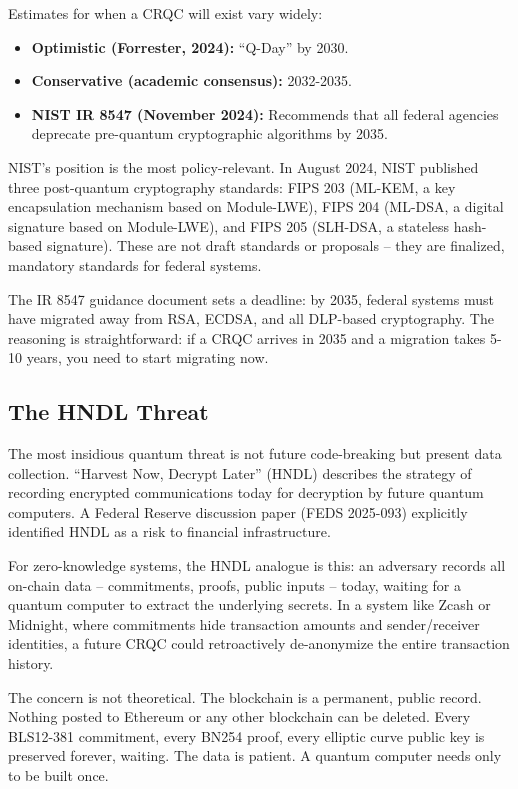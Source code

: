 \documentclass[
  11pt,
  openany]{report}
\providecommand{\tightlist}{%
  \setlength{\itemsep}{0pt}\setlength{\parskip}{0pt}}
\renewcommand{\textbf}[1]{{\bfseries\color{MidnightBold}#1}}
\begin{document}
Estimates for when a CRQC will exist vary widely:

\begin{itemize}
\tightlist
\item
  \textbf{Optimistic (Forrester, 2024):} ``Q-Day'' by 2030.
\item
  \textbf{Conservative (academic consensus):} 2032-2035.
\item
  \textbf{NIST IR 8547 (November 2024):} Recommends that all federal agencies
  deprecate pre-quantum cryptographic algorithms by 2035.
\end{itemize}

NIST's position is the most policy-relevant. In August 2024, NIST published
three post-quantum cryptography standards: FIPS 203 (ML-KEM, a key encapsulation
mechanism based on Module-LWE), FIPS 204 (ML-DSA, a digital signature based on
Module-LWE), and FIPS 205 (SLH-DSA, a stateless hash-based signature). These are
not draft standards or proposals -- they are finalized, mandatory standards for
federal systems.

The IR 8547 guidance document sets a deadline: by 2035, federal systems must
have migrated away from RSA, ECDSA, and all DLP-based cryptography. The
reasoning is straightforward: if a CRQC arrives in 2035 and a migration takes
5-10 years, you need to start migrating now.

\subsection{The HNDL Threat}\label{the-hndl-threat}

The most insidious quantum threat is not future code-breaking but present data
collection. ``Harvest Now, Decrypt Later'' (HNDL) describes the strategy of
recording encrypted communications today for decryption by future quantum
computers. A Federal Reserve discussion paper (FEDS 2025-093) explicitly
identified HNDL as a risk to financial infrastructure.

For zero-knowledge systems, the HNDL analogue is this: an adversary records all
on-chain data -- commitments, proofs, public inputs -- today, waiting for a
quantum computer to extract the underlying secrets. In a system like Zcash or
Midnight, where commitments hide transaction amounts and sender/receiver
identities, a future CRQC could retroactively de-anonymize the entire
transaction history.

The concern is not theoretical. The blockchain is a permanent, public record.
Nothing posted to Ethereum or any other blockchain can be deleted. Every
BLS12-381 commitment, every BN254 proof, every elliptic curve public key is
preserved forever, waiting. The data is patient. A quantum computer needs only
to be built once.
\end{document}
